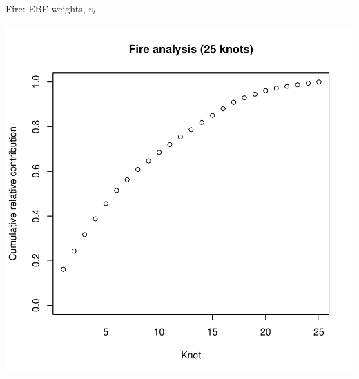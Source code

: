 \documentclass{beamer}
\begin{document}

\begin{frame}{Fire: EBF weights, $v_l$}
	\begin{center}
		\includegraphics[height=0.9\textheight]{firev-25}
	\end{center}
\end{frame}
\end{document}
